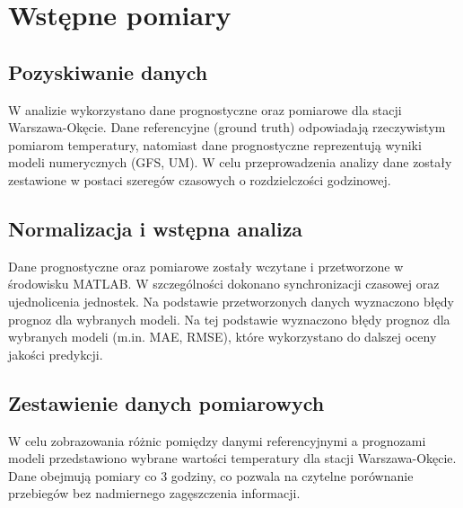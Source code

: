 \documentclass[a4paper,12pt]{article}
\begin{document}
\newpage
\section{Wstępne pomiary}

\subsection{Pozyskiwanie danych}
W analizie wykorzystano dane prognostyczne oraz pomiarowe dla stacji Warszawa-Okęcie.
\noindent
Dane referencyjne (ground truth) odpowiadają rzeczywistym pomiarom temperatury, natomiast dane prognostyczne reprezentują wyniki modeli numerycznych (GFS, UM).
\noindent
W celu przeprowadzenia analizy dane zostały zestawione w postaci szeregów czasowych o rozdzielczości godzinowej.
\subsection{Normalizacja i wstępna analiza}

Dane prognostyczne oraz pomiarowe zostały wczytane i przetworzone w środowisku MATLAB. W szczególności dokonano synchronizacji czasowej oraz ujednolicenia jednostek.
\noindent
Na podstawie przetworzonych danych wyznaczono błędy prognoz dla wybranych modeli.
\noindent
Na tej podstawie wyznaczono błędy prognoz dla wybranych modeli (m.in. MAE, RMSE), które wykorzystano do dalszej oceny jakości predykcji.
\subsection{Zestawienie danych pomiarowych}
W celu zobrazowania różnic pomiędzy danymi referencyjnymi a prognozami modeli przedstawiono wybrane wartości temperatury dla stacji Warszawa-Okęcie. Dane obejmują pomiary co 3 godziny, co pozwala na czytelne porównanie przebiegów bez nadmiernego zagęszczenia informacji.
\end{document}
